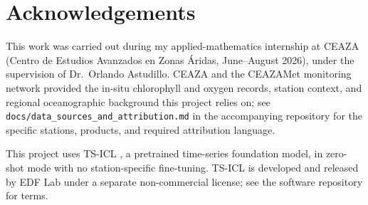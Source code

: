 \section*{Acknowledgements}

This work was carried out during my applied-mathematics internship at CEAZA
(Centro de Estudios Avanzados en Zonas \'Aridas, June--August 2026), under the
supervision of Dr.\ Orlando Astudillo. CEAZA and the CEAZAMet monitoring network
provided the in-situ chlorophyll and oxygen records, station context, and
regional oceanographic background this project relies on; see
\texttt{docs/data\_sources\_and\_attribution.md} in the accompanying repository
for the specific stations, products, and required attribution language.

This project uses TS-ICL \citep{lenaour2026tsicl,tsicl_software}, a pretrained
time-series foundation model, in zero-shot mode with no station-specific
fine-tuning. TS-ICL is developed and released by EDF Lab under a separate
non-commercial license; see the software repository for terms.
